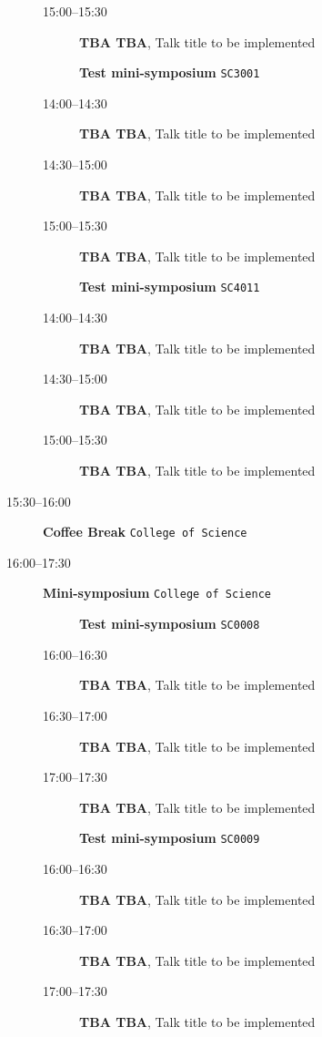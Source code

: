 \documentclass[ILAS2025-program.tex]{subfiles}
\begin{document}
\begin{description}
\begin{description}
        \item[15:00--15:30] \textbf{TBA TBA}, Talk title to be implemented
        \end{description}
    \begin{description}
    \item[] \textbf{Test mini-symposium} {\footnotesize\texttt{SC3001}}
    \item[14:00--14:30] \textbf{TBA TBA}, Talk title to be implemented
        \item[14:30--15:00] \textbf{TBA TBA}, Talk title to be implemented
        \item[15:00--15:30] \textbf{TBA TBA}, Talk title to be implemented
        \end{description}
    \begin{description}
    \item[] \textbf{Test mini-symposium} {\footnotesize\texttt{SC4011}}
    \item[14:00--14:30] \textbf{TBA TBA}, Talk title to be implemented
        \item[14:30--15:00] \textbf{TBA TBA}, Talk title to be implemented
        \item[15:00--15:30] \textbf{TBA TBA}, Talk title to be implemented
        \end{description}
    \item[15:30--16:00] \textbf{Coffee Break} {\footnotesize\texttt{College of Science}}
    \item[16:00--17:30] \textbf{Mini-symposium} {\footnotesize\texttt{College of Science}}
    \begin{description}
    \item[] \textbf{Test mini-symposium} {\footnotesize\texttt{SC0008}}
    \item[16:00--16:30] \textbf{TBA TBA}, Talk title to be implemented
        \item[16:30--17:00] \textbf{TBA TBA}, Talk title to be implemented
        \item[17:00--17:30] \textbf{TBA TBA}, Talk title to be implemented
        \end{description}
    \begin{description}
    \item[] \textbf{Test mini-symposium} {\footnotesize\texttt{SC0009}}
    \item[16:00--16:30] \textbf{TBA TBA}, Talk title to be implemented
        \item[16:30--17:00] \textbf{TBA TBA}, Talk title to be implemented
        \item[17:00--17:30] \textbf{TBA TBA}, Talk title to be implemented

\end{description}
\end{description}
\end{document}
